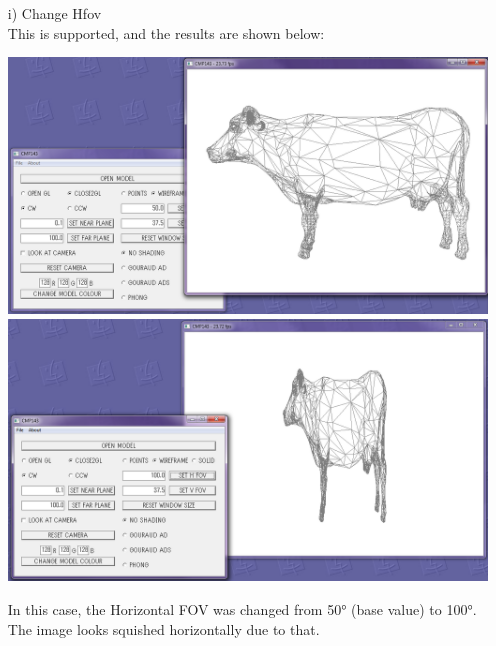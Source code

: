 \documentclass[12pt]{article}
\begin{document}
\begin{itemize}
\begin{itemize}
\item[i)] Change Hfov\\
This is supported, and the results are shown below:
\begin{center}
\includegraphics[scale=0.4]{8.png}
\includegraphics[scale=0.4]{12.png}
\end{center}
In this case, the Horizontal FOV was changed from 50° (base value) to 100°. The image looks squished horizontally due to that.


\end{itemize}
\end{itemize}
\end{document}
